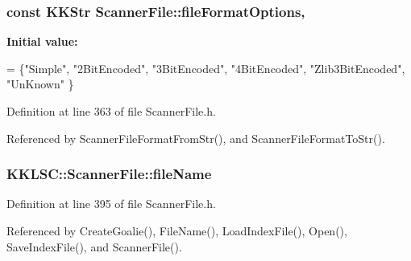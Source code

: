 \subsubsection[{\texorpdfstring{file\+Format\+Options}{fileFormatOptions}}]{\setlength{\rightskip}{0pt plus 5cm}const {\bf K\+K\+Str} Scanner\+File\+::file\+Format\+Options\hspace{0.3cm}{\ttfamily [static]}, {\ttfamily [protected]}}\hypertarget{class_k_k_l_s_c_1_1_scanner_file_a0dfb6d8d812cde3a9a23bad90f8b49f2}{}\label{class_k_k_l_s_c_1_1_scanner_file_a0dfb6d8d812cde3a9a23bad90f8b49f2}
{\bfseries Initial value\+:}
\begin{DoxyCode}
= \{\textcolor{stringliteral}{"Simple"},
       \textcolor{stringliteral}{"2BitEncoded"},
       \textcolor{stringliteral}{"3BitEncoded"},
       \textcolor{stringliteral}{"4BitEncoded"},
       \textcolor{stringliteral}{"Zlib3BitEncoded"},
       \textcolor{stringliteral}{"UnKnown"}
      \}
\end{DoxyCode}


Definition at line 363 of file Scanner\+File.\+h.



Referenced by Scanner\+File\+Format\+From\+Str(), and Scanner\+File\+Format\+To\+Str().

\subsubsection[{\texorpdfstring{file\+Name}{fileName}}]{ K\+K\+L\+S\+C\+::\+Scanner\+File\+::file\+Name\hspace{0.3cm}{\ttfamily [protected]}}\hypertarget{class_k_k_l_s_c_1_1_scanner_file_a1078c1360a71957a3cec77bb675fc144}{}\label{class_k_k_l_s_c_1_1_scanner_file_a1078c1360a71957a3cec77bb675fc144}


Definition at line 395 of file Scanner\+File.\+h.



Referenced by Create\+Goalie(), File\+Name(), Load\+Index\+File(), Open(), Save\+Index\+File(), and Scanner\+File().

